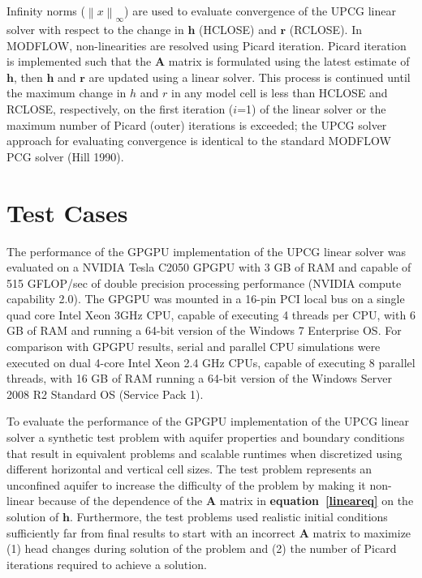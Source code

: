\documentclass[12pt]{article}
\begin{document}
Infinity norms ($\left \|  x \right \|_{\infty}$) are used to evaluate convergence of the UPCG linear solver with respect to the change in $\mathbf{h}$ (HCLOSE) and $\mathbf{r}$ (RCLOSE). In MODFLOW, non-linearities are resolved using Picard iteration. Picard iteration is implemented such that the $\mathbf{A}$ matrix is formulated using the latest estimate of $\mathbf{h}$, then $\mathbf{h}$ and $\mathbf{r}$ are updated using a linear solver. This process is continued until the maximum change in $h$ and $r$ in any model cell is less than HCLOSE and RCLOSE, respectively, on the first iteration ($i$=1) of the linear solver or the maximum number of Picard (outer) iterations is exceeded; \color{cyan}the UPCG solver approach for evaluating convergence is identical to the standard MODFLOW PCG solver (Hill 1990).\color{black}


\section* {\bf Test Cases}
The performance of the GPGPU implementation of the UPCG linear solver was evaluated on a NVIDIA Tesla C2050 GPGPU with 3 GB of RAM and capable of 515 GFLOP/sec of double precision processing performance (NVIDIA compute capability 2.0). The GPGPU was mounted in a 16-pin PCI local bus on a single quad core Intel \color{cyan}Xeon \color{black}3GHz CPU, capable of executing 4 threads per CPU, with 6 GB of RAM and running a 64-bit version of the Windows 7 Enterprise OS. For comparison with GPGPU results, \color{cyan}serial and \color{black}parallel CPU simulations were executed on dual 4-core Intel \color{cyan}Xeon \color{black}2.4 GHz CPUs, capable of executing 8 parallel threads, with 16 GB of RAM running a 64-bit version of the Windows Server 2008 R2 Standard OS (Service Pack 1).

\color{blue}To evaluate the performance of the GPGPU implementation of the UPCG linear solver a  synthetic test problem with aquifer properties and boundary conditions that result in equivalent problems and scalable runtimes when discretized using different horizontal and vertical cell sizes. The test problem represents an unconfined aquifer to increase the difficulty of the problem by making it non-linear because of the dependence of the $\mathbf{A}$ matrix in \textbf{equation~\ref{lineareq}} on the solution of $\mathbf{h}$. Furthermore, the test problems used realistic initial conditions sufficiently far from final results to start with an incorrect $\mathbf{A}$ matrix to maximize (1) head changes during solution of the problem and (2) the number of Picard iterations required to achieve a solution.\color{black}
\end{document}
